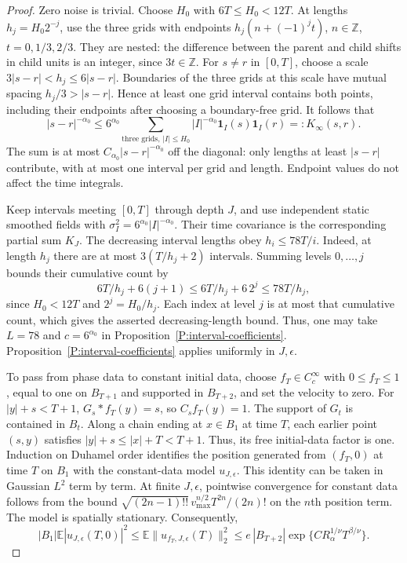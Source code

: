 \documentclass[12pt]{article}
\numberwithin{equation}{section}
\theoremstyle{definition}
\newcommand{\E}{\mathbb{E}}
\begin{document}
\begin{proof}
  Zero noise is trivial. Choose $H_0$ with $6T\le H_0<12T$.
  At lengths $h_j=H_0 2^{-j}$, use the three grids with endpoints
  $h_j(n+(-1)^j t)$, $n\in\mathbb Z$, $t=0,1/3,2/3$.
  They are nested: the difference between the parent and child shifts
  in child units is an integer, since $3t\in\mathbb Z$.
  For $s\ne r$ in $[0,T]$, choose a scale
  $3|s-r|<h_j\le6|s-r|$.
  Boundaries of the three grids at this scale have mutual spacing
  $h_j/3>|s-r|$. Hence at least one grid interval contains both points,
  including their endpoints after choosing a boundary-free grid.
  It follows that
  \begin{equation}\label{E:dyadic-time-majorant}
    |s-r|^{-\alpha_0}
    \le6^{\alpha_0}\sum_{\text{three grids},\,|I|\le H_0}
    |I|^{-\alpha_0}\mathbf1_I(s)\mathbf1_I(r)=:K_\infty(s,r).
  \end{equation}
  The sum is at most $C_{\alpha_0}|s-r|^{-\alpha_0}$ off the diagonal:
  only lengths at least $|s-r|$ contribute, with at most one interval
  per grid and length. Endpoint values do not affect the time integrals.

  Keep intervals meeting $[0,T]$ through depth $J$, and use independent
  static smoothed fields with $\sigma_I^2=6^{\alpha_0}|I|^{-\alpha_0}$.
  Their time covariance is the corresponding partial sum $K_J$.
  The decreasing interval lengths obey $h_i\le78T/i$.
  Indeed, at length $h_j$ there are at most $3(T/h_j+2)$ intervals.
  Summing levels $0,\ldots,j$ bounds their cumulative count by
  \[
    6T/h_j+6(j+1)\le6T/h_j+6\,2^j\le78T/h_j,
  \]
  since $H_0<12T$ and $2^j=H_0/h_j$.
  Each index at level $j$ is at most that cumulative count, which gives
  the asserted decreasing-length bound. Thus, one may take $L=78$
  and $c=6^{\alpha_0}$ in Proposition~\ref{P:interval-coefficients}.
  Proposition~\ref{P:interval-coefficients} applies uniformly in $J,\epsilon$.

  To pass from phase data to constant initial data, choose
  $f_T\in C_c^\infty$ with $0\le f_T\le1$, equal to one on $B_{T+1}$
  and supported in $B_{T+2}$, and set the velocity to zero.
  For $|y|+s<T+1$, $G_s*f_T(y)=s$, so $C_sf_T(y)=1$.
  The support of $G_t$ is contained in $B_t$.
  Along a chain ending at $x\in B_1$ at time $T$, each earlier point
  $(s,y)$ satisfies $|y|+s\le|x|+T<T+1$.
  Thus, its free initial-data factor is one.
  Induction on Duhamel order identifies the position generated
  from $(f_T,0)$ at time $T$ on $B_1$ with the constant-data model
  $u_{J,\epsilon}$.
  This identity can be taken in Gaussian $L^2$ term by term.
  At finite $J,\epsilon$, pointwise convergence for constant data follows
  from the bound
  $\sqrt{(2n-1)!!}\,v_{\max}^{n/2}T^{2n}/(2n)!$
  on the $n$th position term.
  The model is spatially stationary. Consequently,
  \[
    |B_1|\E|u_{J,\epsilon}(T,0)|^2
    \le\E\|u_{f_T,J,\epsilon}(T)\|_2^2
    \le e\,|B_{T+2}|\exp\{C R_\alpha^{1/\nu}T^{\beta/\nu}\}.
  \]


\end{proof}
\end{document}
